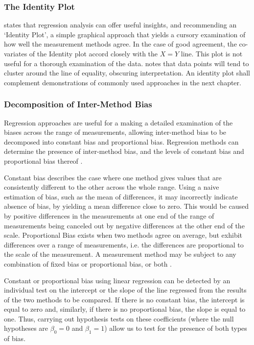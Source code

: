 \documentclass[12pt, a4paper]{report}
\theoremstyle{plain}
\theoremstyle{definition}
\theoremstyle{remark}
\begin{document}
\subsubsection*{The Identity Plot}
	\citet{BA83} states that regression analysis can offer useful insights, and recommending an `Identity Plot', a simple graphical approach that yields a cursory examination of how well the measurement methods agree. In the case of good agreement, the co-variates of the Identity plot accord closely with the $X=Y$ line. This plot is not useful for a thorough examination of the data. \citet{BritHypSoc} notes that data points will tend to cluster around the line of equality,
	obscuring interpretation. An identity plot shall complement demonstrations of commonly used approaches in the next chapter.
	
	
	\subsubsection*{Decomposition of Inter-Method Bias}
	Regression approaches are useful for a making a detailed examination of the biases across the range of measurements, allowing inter-method bias to be decomposed into constant bias and proportional bias. Regression methods can determine the presence of inter-method bias, and the levels of constant bias and proportional bias thereof \cite{ludbrook97,ludbrook02}. 
	
	Constant bias describes the case where one method gives values that are consistently different to the other across the whole range. Using a naive estimation of bias, such as the mean of differences, it may incorrectly indicate absence of bias, by yielding a mean difference close to zero. This would be caused by positive differences in the measurements at one end of the range of measurements being canceled out by negative differences at the other end of the scale. Proportional Bias exists when two methods agree on average, but exhibit differences over a range of measurements, i.e. the differences are proportional to the scale of the measurement.	A measurement method may be subject to any combination of fixed bias or proportional bias, or both \citep{ludbrook02}. 
	
	Constant or proportional bias using linear regression can be detected by an individual test on the intercept or the slope of the line regressed from the results of the two methods to be compared. If there is no constant bias, the intercept is equal to zero and, similarly, if there is no proportional bias, the slope is equal to one. Thus, carrying out hypothesis tests on these coefficients (where the null hypotheses are $\beta_0=0$ and $\beta_1=1$) allow us to test for the presence of both types of bias.
	
\end{document}
